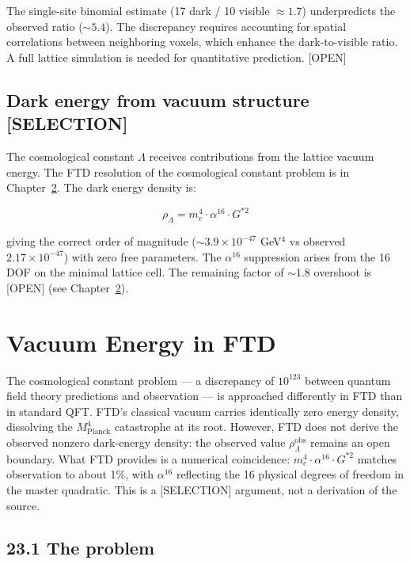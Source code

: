 \documentclass[
  11pt,
  letterpaper,
  twoside,
  openany]{book}
\makeatletter
\let\orig@section\section
\renewcommand{\section}{\needspace{8\baselineskip}\orig@section}
\newcommand{\Gssq}{G^{*2}{}}      %
\makeatother
\begin{document}
The single-site binomial estimate (17 dark / 10 visible \(\approx 1.7\))
underpredicts the observed ratio (\(\sim 5.4\)). The discrepancy
requires accounting for spatial correlations between neighboring voxels,
which enhance the dark-to-visible ratio. A full lattice simulation is
needed for quantitative prediction. {[}OPEN{]}

\section{Dark energy from vacuum structure
{[}SELECTION{]}}\label{dark-energy-from-vacuum-structure-selection}

The cosmological constant \(\Lambda\) receives contributions from the
lattice vacuum energy. The FTD resolution of the cosmological constant
problem is in Chapter~\ref{sec-vacuum}. The dark energy density is:

\[
\rho_\Lambda = m_e^4 \cdot \alpha^{16} \cdot \Gssq
\tag{22.2}
\]

giving the correct order of magnitude (\(\sim 3.9 \times 10^{-47}\)
GeV\(^4\) vs observed \(2.17 \times 10^{-47}\)) with zero free
parameters. The \(\alpha^{16}\) suppression arises from the 16 DOF on
the minimal lattice cell. The remaining factor of \(\sim 1.8\) overshoot
is {[}OPEN{]} (see Chapter~\ref{sec-vacuum}).

\chapter{Vacuum Energy in FTD}\label{sec-vacuum}

The cosmological constant problem --- a discrepancy of \(10^{123}\)
between quantum field theory predictions and observation --- is
approached differently in FTD than in standard QFT. FTD's classical
vacuum carries identically zero energy density, dissolving the
\(M_\text{Planck}^4\) catastrophe at its root. However, FTD does not
derive the observed nonzero dark-energy density: the observed value
\(\rho_\Lambda^\text{obs}\) remains an open boundary. What FTD provides
is a numerical coincidence: \(m_e^4 \cdot \alpha^{16} \cdot G^{*2}\)
matches observation to about 1\%, with \(\alpha^{16}\) reflecting the 16
physical degrees of freedom in the master quadratic. This is a
{[}SELECTION{]} argument, not a derivation of the source.

\section{23.1 The problem}\label{the-problem}
\end{document}

